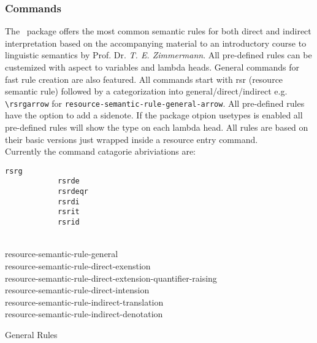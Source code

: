 \documentclass[10pt, a4paper]{article}
\begin{document}
	\subsubsection{Commands}
	The \FraGoLi\ package offers the most common semantic rules for both direct and indirect interpretation based on the accompanying material to an introductory course to linguistic semantics by Prof. Dr. \textit{T. E. Zimmermann}. All pre-defined rules can be custemized with aspect to variables and lambda heads. General commands for fast rule creation are also featured. All commands start with rsr (resource semantic rule) followed by a categorization into general/direct/indirect e.g. \verb=\rsrgarrow= for \texttt{resource-semantic-rule-general-arrow}. All pre-defined rules have the option to add a sidenote. If the package otpion usetypes is enabled all pre-defined rules will show the type on each lambda head. All rules are based on their basic versions just wrapped inside a resource entry command.
	\\Currently the command catagorie abriviations are:
	\begin{center}
		\begin{minipage}[h][3.3cm][t]{10em}
			\begin{lstlisting}[style=B]
			rsrg
			rsrde
			rsrdeqr
			rsrdi
			rsrit
			rsrid
			\end{lstlisting}
		\end{minipage}
		\begin{minipage}[h][3.3cm][t]{30em}
			\begin{fgls}
				\ \\
				resource-semantic-rule-general\\
				resource-semantic-rule-direct-exenstion\\
				resource-semantic-rule-direct-extension-quantifier-raising\\
				resource-semantic-rule-direct-intension\\
				resource-semantic-rule-indirect-translation\\
				resource-semantic-rule-indirect-denotation
			\end{fgls}
		\end{minipage}
	\end{center}
	General Rules
\end{document}
